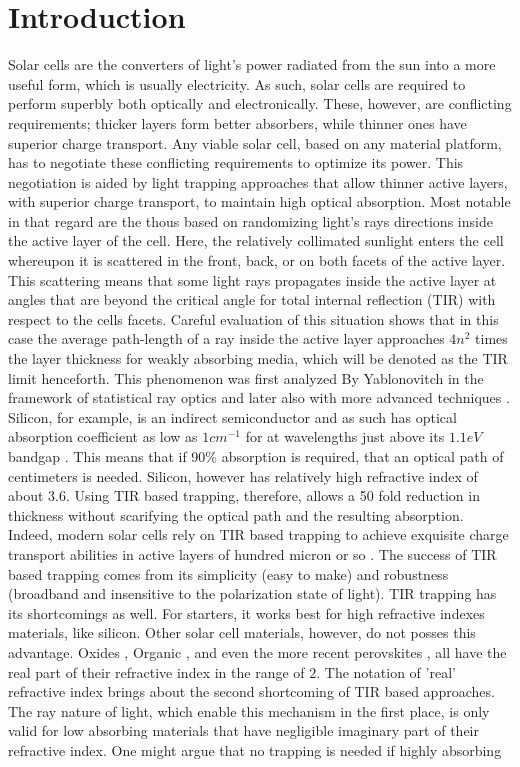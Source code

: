 \documentclass[a4paper]{article}
\begin{document}
\section{Introduction}
Solar cells are the converters of light's power radiated from the sun into a more useful form, which is usually electricity. As such, solar cells are required to perform superbly both optically and electronically. These, however, are conflicting requirements; thicker layers form better absorbers, while thinner ones have superior charge transport. Any viable solar cell, based on any material platform, has to negotiate these conflicting requirements to optimize its power. This negotiation is aided by light trapping approaches that allow thinner active layers, with superior charge transport, to maintain high optical absorption. Most notable in that regard are the thous based on randomizing light's rays directions inside the active layer of the cell. Here, the relatively collimated sunlight enters the cell whereupon it is scattered in the front, back, or on both facets of the active layer. This scattering means that some light rays propagates inside the active layer at angles that are beyond the critical angle for total internal reflection (TIR) with respect to the cells facets. Careful evaluation of this situation shows that in this case the average path-length of a ray inside the active layer approaches $4n^2$ times the layer thickness for weakly absorbing media, which will be denoted as the TIR limit henceforth. This phenomenon was first analyzed By Yablonovitch in the framework of statistical ray optics \cite{Yablonovitch82josa} and later also with more advanced techniques \cite{Gee1988, Green2002}. Silicon, for example, is an indirect semiconductor and as such has optical absorption coefficient as low as $1 cm^{-1}$ for at wavelengths just above its $1.1 eV$ bandgap \cite{Si_Prop} . This means that if 90\% absorption is required, that an optical path of centimeters is needed. Silicon, however has relatively high refractive index of about $3.6$. Using TIR based trapping, therefore, allows a 50 fold reduction in thickness without scarifying the optical path and the resulting absorption. Indeed, modern solar cells rely on TIR based trapping to achieve exquisite charge transport abilities in active layers of hundred micron or so \cite{GreenIIIgen}. The success of TIR based trapping comes from its simplicity (easy to make) and robustness (broadband and insensitive to the polarization state of light). TIR trapping has its shortcomings as well. For starters, it works best for high refractive indexes materials, like silicon. Other solar cell materials, however, do not posses this advantage. Oxides \cite{Warren2013c}, Organic \cite{chen2018donor}, and even the more recent perovskites \cite{chen2018large}, all have the real part of their refractive index in the range of $2$. The notation of 'real' refractive index brings about the second shortcoming of TIR based approaches. The ray nature of light, which enable this mechanism in the first place, is only valid for low absorbing materials that have negligible imaginary part of their refractive index. One might argue that no trapping is needed if highly absorbing 
\end{document}
